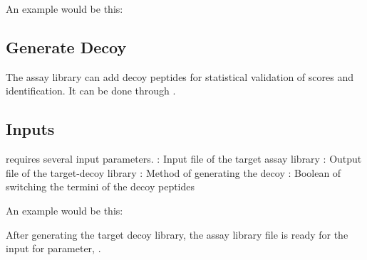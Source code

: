 \documentclass[letterpaper,10pt,english]{sphinxmanual}
\begin{document}
An example would be this:

\begin{sphinxVerbatim}[commandchars=\\\{\}]
     \PYGZbs{}
                         
\end{sphinxVerbatim}


\subsection{Generate Decoy}
\label{\detokenize{librarygeneration:generate-decoy}}
The assay library can add decoy peptides for statistical validation of scores
and identification. It can be done through .


\subsection{Inputs}
\label{\detokenize{librarygeneration:id1}}
 requires several input parameters.
\textendash{} : Input file of the target assay library
\textendash{} : Output file of the target-decoy library
\textendash{} : Method of generating the decoy
\textendash{} : Boolean of switching the termini of the decoy peptides

An example would be this:

\begin{sphinxVerbatim}[commandchars=\\\{\}]
   \PYGZbs{}
                          \PYGZbs{}
                          \PYGZbs{}
                         
\end{sphinxVerbatim}

After generating the target decoy library, the assay library file is ready for the
input for  parameter, .
\end{document}
